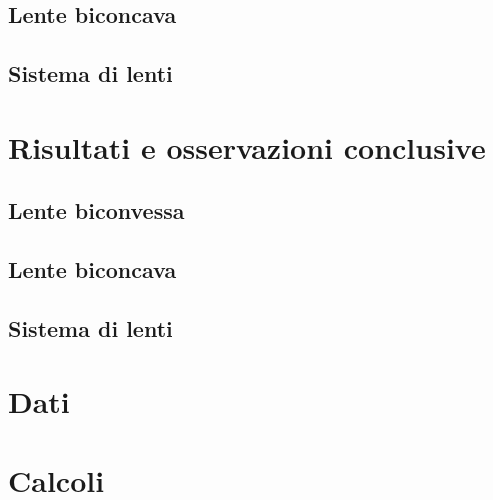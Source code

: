 \documentclass[a4paper]{article}
\begin{document}
    \subsection{Lente biconcava}
    \subsection{Sistema di lenti}
\section{Risultati e osservazioni conclusive}
    \subsection{Lente biconvessa}
    \subsection{Lente biconcava}
    \subsection{Sistema di lenti}
\begin{appendices}
    \section{Dati}
    \section{Calcoli}
\end{appendices}
\end{document}

